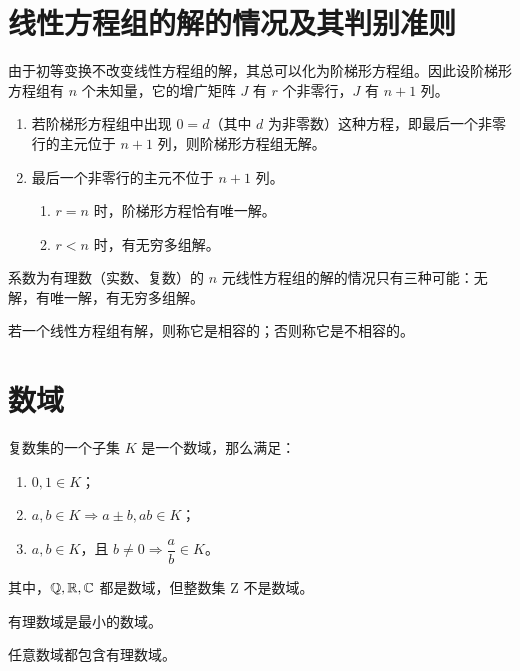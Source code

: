 \section{线性方程组的解的情况及其判别准则}


由于初等变换不改变线性方程组的解，其总可以化为阶梯形方程组。因此设阶梯形方程组有 $n$ 个未知量，它的增广矩阵 $J$ 有 $r$ 个非零行，$J$ 有 $n+1$ 列。

\begin{enumerate}
	\item 若阶梯形方程组中出现 $0=d$（其中 $d$ 为非零数）这种方程，即最后一个非零行的主元位于 $n+1$ 列，则阶梯形方程组无解。
	\item 最后一个非零行的主元不位于 $n+1$ 列。
	
	\begin{enumerate}
		\item $r=n$ 时，阶梯形方程恰有唯一解。
		\item $r<n$ 时，有无穷多组解。
	\end{enumerate}
\end{enumerate}

\begin{theorem}
	系数为有理数（实数、复数）的 $n$ 元线性方程组的解的情况只有三种可能：无解，有唯一解，有无穷多组解。
\end{theorem}

若一个线性方程组有解，则称它是相容的；否则称它是不相容的。

\section{数域}

\begin{definition}
	复数集的一个子集 $K$ 是一个数域，那么满足：

	\begin{enumerate}
		\item $0,1 \in K$；
		\item $a,b \in K \Rightarrow a \pm b,ab \in K$；
		\item $a,b \in K$，且 $b \ne 0 \Rightarrow \dfrac{a}{b} \in K$。
	\end{enumerate}
\end{definition}

其中，$\mathbb{Q},\mathbb{R},\mathbb{C}$ 都是数域，但整数集 $\mathrm{Z}$ 不是数域。

有理数域是最小的数域。

\begin{theorem}
	任意数域都包含有理数域。
\end{theorem}


